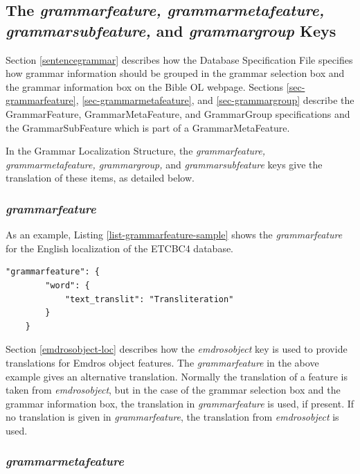 \documentclass[11pt,oneside,a4paper]{memoir}
\begin{document}
\subsection{The \emph{grammarfeature, grammarmetafeature, grammarsubfeature,} and \emph{grammargroup} Keys}%
\label{grammar-loc}

Section \ref{sentencegrammar} describes how the Database Specification File specifies how grammar
information should be grouped in the grammar selection box and the grammar information box on the
Bible OL webpage. Sections \ref{sec-grammarfeature}, \ref{sec-grammarmetafeature}, and
\ref{sec-grammargroup} describe the GrammarFeature, GrammarMetaFeature, and GrammarGroup
specifications and the GrammarSubFeature which is part of a GrammarMetaFeature.

In the Grammar Localization Structure, the \emph{grammarfeature, grammarmetafeature, grammargroup,} and
\emph{grammarsubfeature} keys give the translation of these items, as detailed below.

\subsubsection{\emph{grammarfeature}}

As an example, Listing \ref{list-grammarfeature-sample} shows the \emph{grammarfeature} for the
English localization of the ETCBC4 database.

\begin{lstlisting}[caption=A sample grammarfeature value,label=list-grammarfeature-sample]
    "grammarfeature": {
        "word": {
            "text_translit": "Transliteration"
        }
    }
\end{lstlisting}

Section \ref{emdrosobject-loc} describes how the \emph{emdrosobject} key is used
to provide translations for Emdros object features. The \emph{grammarfeature} in the above example
gives an alternative translation. Normally the translation of a feature is taken from
\emph{emdrosobject}, but in the case of the grammar selection box and
the grammar information box, the translation in \emph{grammarfeature}
is used, if present. If no translation is given in \emph{grammarfeature}, the translation from
\emph{emdrosobject} is used.


\subsubsection{\emph{grammarmetafeature}}
\end{document}
